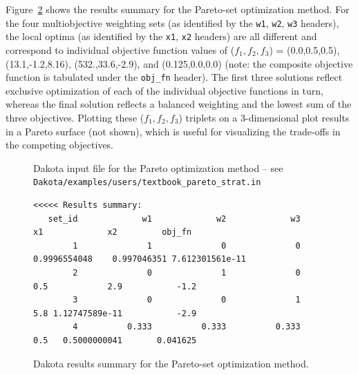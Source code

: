 Figure~\ref{adv_meth:figure05} shows the results summary for the
Pareto-set optimization method. For the four multiobjective
weighting sets (as identified by the \texttt{w1}, \texttt{w2},
\texttt{w3} headers), the local optima (as identified by the
\texttt{x1}, \texttt{x2} headers) are all different and correspond to
individual objective function values of ($f_1,f_2,f_3$) =
(0.0,0.5,0.5), (13.1,-1.2,8.16), (532.,33.6,-2.9), and (0.125,0.0,0.0)
(note: the composite objective function is tabulated under the
\texttt{obj\_fn} header).  The first three solutions reflect exclusive
optimization of each of the individual objective functions in turn,
whereas the final solution reflects a balanced weighting and the
lowest sum of the three objectives.  Plotting these ($f_1,f_2,f_3$)
triplets on a 3-dimensional plot results in a Pareto surface (not
shown), which is useful for visualizing the trade-offs in the
competing objectives.

\begin{figure}
  \centering
  \begin{bigbox}
    \begin{small}
    \end{small}
  \end{bigbox}
  \caption{Dakota input file for the Pareto optimization method --
see \texttt{Dakota/examples/users/textbook\_pareto\_strat.in} }
  \label{adv_meth:figure04}
\end{figure}

\begin{figure}
\centering
\begin{bigbox}
\begin{scriptsize}
\begin{verbatim}
<<<<< Results summary:
   set_id             w1             w2             w3             x1             x2         obj_fn
        1              1              0              0   0.9996554048    0.997046351 7.612301561e-11
        2              0              1              0            0.5            2.9           -1.2
        3              0              0              1            5.8 1.12747589e-11           -2.9
        4          0.333          0.333          0.333            0.5   0.5000000041       0.041625
\end{verbatim}
\end{scriptsize}
\end{bigbox}
\caption{Dakota results summary for the Pareto-set optimization
  method.}
\label{adv_meth:figure05}
\end{figure}

